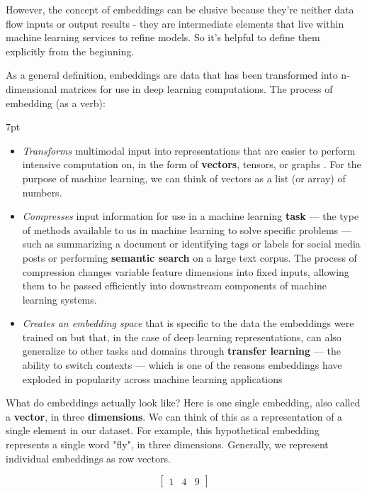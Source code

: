 \documentclass[11pt, table]{diazessay} %
\newenvironment{formal}{%
  \def\FrameCommand{%
	\hspace{1pt}%
	{\color{w_lightblue}\vrule width 2pt}%
	{\color{formalshade}\vrule width 4pt}%
	\colorbox{formalshade}%
  }%
  \MakeFramed{\advance\hsize-\width\FrameRestore}%
  \noindent\hspace{-4.55pt}%
  \begin{adjustwidth}{}{7pt}%
  \vspace{2pt}\vspace{2pt}%
}
{%
  \vspace{2pt}\end{adjustwidth}\endMakeFramed%
}
\begin{document}
\begin{sloppypar}
However, the concept of embeddings can be elusive because they're neither data flow inputs or output results - they are intermediate elements that live within machine learning services to refine models. So it's helpful to define them explicitly from the beginning.

As a general definition, embeddings are data that has been transformed into n-dimensional matrices for use in deep learning computations. The process of embedding (as a verb):  
\begin{formal}
\begin{itemize}
   \item \emph{Transforms} multimodal input into representations that are easier to perform intensive computation on, in the form of \textbf{vectors}, tensors, or graphs \citep{rao2019natural}. For the purpose of machine learning, we can think of vectors as a list (or array) of numbers.
  \item \emph{Compresses} input information for use in a machine learning \textbf{task} --- the type of methods available to us in machine learning to solve specific problems --- such as summarizing a document or identifying tags or labels for social media posts or performing \textbf{semantic search} on a large text corpus. The process of compression changes variable feature dimensions into fixed inputs, allowing them to be passed efficiently into downstream components of machine learning systems.
  \item \emph{Creates an embedding space} that is specific to the data the embeddings were trained on but that, in the case of deep learning representations, can also generalize to other tasks and domains through \textbf{transfer learning} --- the ability to switch contexts --- which is one of the reasons embeddings have exploded in popularity across machine learning applications
\end{itemize}
\end{formal}

What do embeddings actually look like? Here is one single embedding, also called a \textbf{vector}, in three \textbf{dimensions}. We can think of this as a representation of a single element in our dataset. For example, this hypothetical embedding represents a single word "fly", in three dimensions.  Generally, we represent individual embeddings as row vectors.

\begin{equation}
\begin{bmatrix}
1 & 4 & 9
\end{bmatrix}
\end{equation}



\end{sloppypar}
\end{document}

